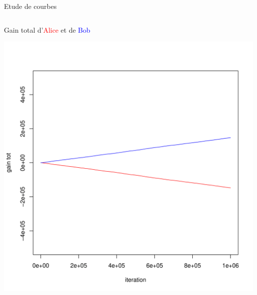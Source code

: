 \begin{frame}{Etude de courbes}
\begin{columns}
        \begin{column}{0.5 \textwidth}
         \begin{small}
          \hspace{-0.24 cm} Gain total d'\textcolor{red}{Alice} et de \textcolor{blue}{Bob} 
          \end{small}
        \centering
            \includegraphics[width =\textwidth]{Images/Courbes/lrp-2.png}
       \end{column}
        \end{columns}



    
\end{frame}